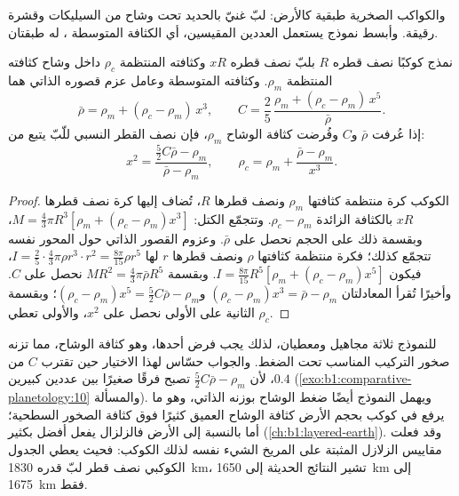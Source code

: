 والكواكب الصخرية طبقية كالأرض: لبّ غنيّ بالحديد تحت وشاح من السيليكات وقشرة رقيقة. وأبسط نموذج يستعمل العددين المقيسين، أي الكثافة المتوسطة ، له طبقتان.

\begin{proposition}\label{prop:b1:comparative-planetology:two-layer}
نمذج كوكبًا نصف قطره $R$ بلبّ نصف قطره $xR$ وكثافته المنتظمة $\rho_c$ داخل وشاح كثافته المنتظمة $\rho_m$. وكثافته المتوسطة وعامل عزم قصوره الذاتي هما
\[
  \bar\rho = \rho_m + (\rho_c - \rho_m)\,x^3 , \qquad
  C = \frac25\,\frac{\rho_m + (\rho_c - \rho_m)\,x^5}{\bar\rho} .
\]
إذا عُرفت $\bar\rho$ و$C$ وفُرضت كثافة الوشاح $\rho_m$، فإن نصف القطر النسبي للّبّ يتبع من:
\[
  x^2 = \frac{\tfrac52C\bar\rho - \rho_m}{\bar\rho - \rho_m} ,
  \qquad \rho_c = \rho_m + \frac{\bar\rho - \rho_m}{x^3} .
\]
\end{proposition}

\begin{proof}
الكوكب كرة منتظمة كثافتها $\rho_m$ ونصف قطرها $R$، تُضاف إليها كرة نصف قطرها $xR$ بالكثافة الزائدة $\rho_c - \rho_m$. وتتجمّع الكتل:
$M = \tfrac43\pi R^3[\rho_m + (\rho_c - \rho_m)x^3]$، وبقسمة ذلك على الحجم نحصل على $\bar\rho$. وعزوم القصور الذاتي حول المحور نفسه تتجمّع كذلك؛ فكرة منتظمة كثافتها $\rho$ ونصف قطرها $r$ لها
$I = \tfrac25\cdot\tfrac43\pi\rho r^3\cdot r^2 = \tfrac{8\pi}{15}\rho r^5$،
فيكون $I = \tfrac{8\pi}{15}R^5[\rho_m + (\rho_c - \rho_m)x^5]$. وبقسمة $MR^2 = \tfrac43\pi\bar\rho R^5$ نحصل على $C$. وأخيرًا تُقرأ المعادلتان
$(\rho_c - \rho_m)x^3 = \bar\rho - \rho_m$ و$(\rho_c - \rho_m)x^5 =
\tfrac52C\bar\rho - \rho_m$؛ وبقسمة الثانية على الأولى نحصل على $x^2$، والأولى تعطي $\rho_c$.
\end{proof}

للنموذج ثلاثة مجاهيل ومعطيان، لذلك يجب فرض أحدها، وهو كثافة الوشاح، مما تزنه صخور التركيب المناسب تحت الضغط. والجواب حسّاس لهذا الاختيار حين تقترب $C$ من $0.4$، لأن $\tfrac52C\bar\rho - \rho_m$ تصبح فرقًا صغيرًا بين عددين كبيرين (\cref{exo:b1:comparative-planetology:10} والمسألة). ويهمل النموذج أيضًا ضغط الوشاح بوزنه الذاتي، وهو ما يرفع في كوكب بحجم الأرض كثافة الوشاح العميق كثيرًا فوق كثافة الصخور السطحية؛ أما بالنسبة إلى الأرض فالزلزال يفعل أفضل بكثير (\cref{ch:b1:layered-earth}). وقد فعلت مقاييس الزلازل المثبتة على المريخ الشيء نفسه لذلك الكوكب: فحيث يعطي الجدول الكوكبي نصف قطر لبّ قدره \qty{1830}{km}، تشير النتائج الحديثة إلى \qty{1650}{km} إلى \qty{1675}{km} فقط.

